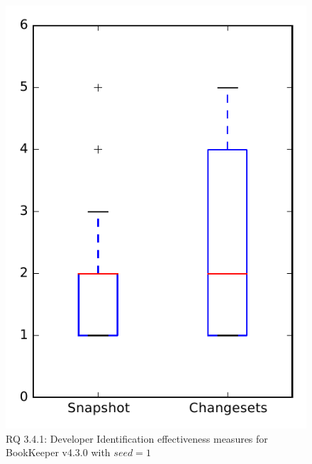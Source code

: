 
\begin{figure}
\centering
\includegraphics[height=0.4\textheight]{figures/dit_seed/rq1_bookkeeper_1}
\caption{RQ 3.4.1: Developer Identification effectiveness measures for BookKeeper v4.3.0 with $seed=1$}
\label{fig:dit_seed:rq1:bookkeeper}
\end{figure}
